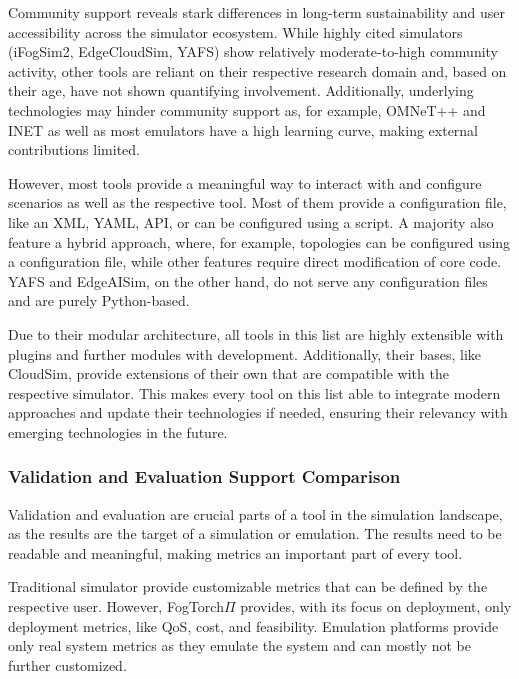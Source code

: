 Community support reveals stark differences in long-term sustainability and user accessibility across the simulator ecosystem.
While highly cited simulators (iFogSim2, EdgeCloudSim, YAFS) show relatively moderate-to-high community activity, other tools are reliant on their respective research domain and, based on their age, have not shown quantifying involvement.
Additionally, underlying technologies may hinder community support as, for example, OMNeT++ and INET as well as most emulators have a high learning curve, making external contributions limited.

However, most tools provide a meaningful way to interact with and configure scenarios as well as the respective tool.
Most of them provide a configuration file, like an XML, YAML, API, or can be configured using a script. 
A majority also feature a hybrid approach, where, for example, topologies can be configured using a configuration file, while other features require direct modification of core code. 
YAFS and EdgeAISim, on the other hand, do not serve any configuration files and are purely Python-based.

Due to their modular architecture, all tools in this list are highly extensible with plugins and further modules with development.
Additionally, their bases, like CloudSim, provide extensions of their own that are compatible with the respective simulator.
This makes every tool on this list able to integrate modern approaches and update their technologies if needed, ensuring their relevancy with emerging technologies in the future.

\subsubsection{Validation and Evaluation Support Comparison}
Validation and evaluation are crucial parts of a tool in the simulation landscape, as the results are the target of a simulation or emulation.
The results need to be readable and meaningful, making metrics an important part of every tool.

Traditional simulator provide customizable metrics that can be defined by the respective user.
However, FogTorch$\Pi$ provides, with its focus on deployment, only deployment metrics, like QoS, cost, and feasibility.
Emulation platforms provide only real system metrics as they emulate the system and can mostly not be further customized.

